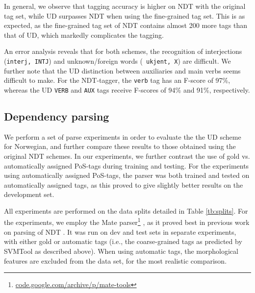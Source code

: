 \documentclass[10pt, a4paper]{article}
\begin{document}
In general, we observe that tagging accuracy is higher on NDT with the
original tag set, while UD surpasses NDT when using the fine-grained
tag set. This is as expected, as the fine-grained tag set of NDT
contains almost 200 more tags than that of UD, which markedly
complicates the tagging.

An error analysis reveals that for both schemes, the recognition of
interjections ({\tt interj, INTJ}) and unknown/foreign words ({\tt
  ukjent, X}) are difficult. We further note that the UD distinction
between auxiliaries and main verbs seems difficult to make. For the
NDT-tagger, the {\tt verb} tag has an F-score of 97\%, whereas the UD
{\tt VERB} and {\tt AUX} tags receive F-scores of 94\% and 91\%,
respectively.


\subsection{Dependency parsing}
We perform a set of parse experiments in order to evaluate the the UD
scheme for Norwegian, and further compare these results to those
obtained using the original NDT schemes. In our experiments, we
further contrast the use of gold vs. automatically assigned PoS-tags
during training and testing. For the experiments using automatically
assigned PoS-tags, the parser was both trained and tested on
automatically assigned tags, as this proved to give slightly better
results on the development set.

All experiments are performed on the data splits detailed in Table
\ref{tb:splits}. For the experiments, we employ the Mate
parser\footnote{\url{code.google.com/archive/p/mate-tools}}
\cite{Boh:10}, as it proved best in previous work on parsing of NDT
\cite{Sol:Skj:Ovr:14}. It was run on dev and test sets in separate
experiments, with either gold or automatic tags (i.e., the
coarse-grained tags as predicted by SVMTool as described above).  When
using automatic tags, the morphological features are excluded from the
data set, for the most realistic comparison. 
\end{document}

